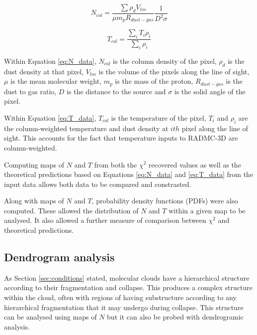 \documentclass{report}
\begin{document}
\noindent\begin{minipage}{.5\linewidth}
\begin{equation}
  N_{col} = \frac{\sum \rho_{d} V_{los}}{ \mu m_{p} R_{dust-gas}} \frac{1}{D^{2} \sigma}
\end{equation} \label{eq:N_data}
\end{minipage}%
\begin{minipage}{.5\linewidth}
\begin{equation}
  T_{col} = \frac{\sum_{i} T_{i} \rho_{i}}{\sum_{i} \rho_{i}}
\end{equation} \label{eq:T_data}
\end{minipage}

Within Equation \ref{eq:N_data}, $N_{col}$ is the column density of the pixel, $\rho_{d}$ is the dust density at that pixel, $V_{los}$ is the volume of the pixels along the line of sight, $\mu$ is the mean molecular weight, $m_{p}$ is the mass of the proton, $R_{dust-gas}$ is the dust to gas ratio, $D$ is the distance to the source and $\sigma$ is the solid angle of the pixel.

Within Equation \ref{eq:T_data}, $T_{col}$ is the temperature of the pixel, $T_{i}$ and $\rho_{i}$ are the column-weighted temperature and dust density at $ith$ pixel along the line of sight. This accounts for the fact that temperature inputs to RADMC-3D are column-weighted.

Computing maps of $N$ and $T$ from both the $\chi^{2}$ recovered values as well as the theoretical predictions based on Equations \ref{eq:N_data} and \ref{eq:T_data} from the input data allows both data to be compared and constrasted.

Along with maps of $N$ and $T$, probability density functions (PDFs) were also computed. These allowed the distribution of $N$ and $T$ within a given map to be analysed. It also allowed a further measure of comparison between $\chi^{2}$ and theoretical predictions.

\subsection{Dendrogram analysis}
As Section \ref{sec:conditions} stated, molecular clouds have a hierarchical structure according to their fragmentation and collapse. This produces a complex structure within the cloud, often with regions of having substructure according to any hierarchical fragmentation that it may undergo during collapse. This structure can be analysed using maps of $N$ but it can also be probed with dendrogramic analysis.
\end{document}
